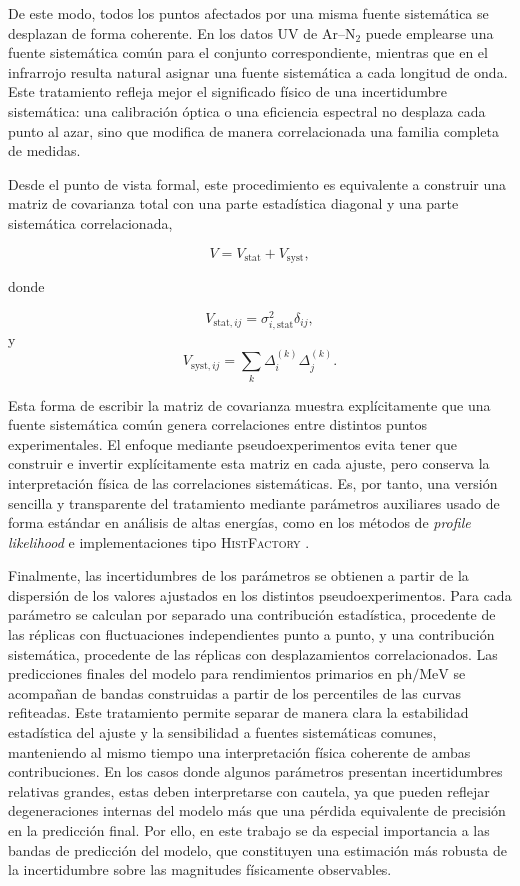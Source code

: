 \documentclass[12pt,a4paper]{article}
\begin{document}
De este modo, todos los puntos afectados por una misma fuente sistemática se desplazan de forma coherente. En los datos UV de Ar--N$_2$ puede emplearse una fuente sistemática común para el conjunto correspondiente, mientras que en el infrarrojo resulta natural asignar una fuente sistemática a cada longitud de onda. Este tratamiento refleja mejor el significado físico de una incertidumbre sistemática: una calibración óptica o una eficiencia espectral no desplaza cada punto al azar, sino que modifica de manera correlacionada una familia completa de medidas.

Desde el punto de vista formal, este procedimiento es equivalente a construir una matriz de covarianza total con una parte estadística diagonal y una parte sistemática correlacionada,

\[
V
=
V_{\mathrm{stat}}
+
V_{\mathrm{syst}},
\]

donde

\[
V_{\mathrm{stat},ij}
=
\sigma_{i,\mathrm{stat}}^2\delta_{ij},
\]
y
\[
V_{\mathrm{syst},ij}
=\sum_k
\Delta_i^{(k)}\Delta_j^{(k)}.
\]

Esta forma de escribir la matriz de covarianza muestra explícitamente que una fuente sistemática común genera correlaciones entre distintos puntos experimentales. El enfoque mediante pseudoexperimentos evita tener que construir e invertir explícitamente esta matriz en cada ajuste, pero conserva la interpretación física de las correlaciones sistemáticas. Es, por tanto, una versión sencilla y transparente del tratamiento mediante parámetros auxiliares usado de forma estándar en análisis de altas energías, como en los métodos de \textit{profile likelihood} e implementaciones tipo \textsc{HistFactory} \cite{Cowan2011,Cranmer2012HistFactory}.

Finalmente, las incertidumbres de los parámetros se obtienen a partir de la dispersión de los valores ajustados en los distintos pseudoexperimentos. Para cada parámetro se calculan por separado una contribución estadística, procedente de las réplicas con fluctuaciones independientes punto a punto, y una contribución sistemática, procedente de las réplicas con desplazamientos correlacionados. Las predicciones finales del modelo para rendimientos primarios en $\mathrm{ph/MeV}$ se acompañan de bandas construidas a partir de los percentiles de las curvas refiteadas. Este tratamiento permite separar de manera clara la estabilidad estadística del ajuste y la sensibilidad a fuentes sistemáticas comunes, manteniendo al mismo tiempo una interpretación física coherente de ambas contribuciones. En los casos donde algunos parámetros presentan incertidumbres relativas grandes, estas deben interpretarse con cautela, ya que pueden reflejar degeneraciones internas del modelo más que una pérdida equivalente de precisión en la predicción final. Por ello, en este trabajo se da especial importancia a las bandas de predicción del modelo, que constituyen una estimación más robusta de la incertidumbre sobre las magnitudes físicamente observables.
\end{document}

